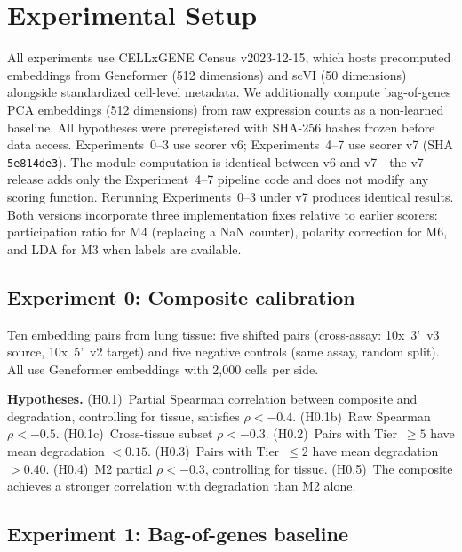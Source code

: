 \documentclass[11pt,letterpaper]{article}
\begin{document}
\section{Experimental Setup}
\label{sec:setup}

All experiments use CELLxGENE Census v2023-12-15, which hosts precomputed embeddings from Geneformer (512 dimensions) and scVI (50 dimensions) alongside standardized cell-level metadata. We additionally compute bag-of-genes PCA embeddings (512 dimensions) from raw expression counts as a non-learned baseline. All hypotheses were preregistered with SHA-256 hashes frozen before data access. Experiments~0--3 use scorer v6; Experiments~4--7 use scorer v7 (SHA \texttt{5e814de3}). The module computation is identical between v6 and v7---the v7 release adds only the Experiment~4--7 pipeline code and does not modify any scoring function. Rerunning Experiments~0--3 under v7 produces identical results. Both versions incorporate three implementation fixes relative to earlier scorers: participation ratio for M4 (replacing a NaN counter), polarity correction for M6, and LDA for M3 when labels are available.

\subsection{Experiment 0: Composite calibration}

Ten embedding pairs from lung tissue: five shifted pairs (cross-assay: 10x~3'~v3 source, 10x~5'~v2 target) and five negative controls (same assay, random split). All use Geneformer embeddings with 2,000 cells per side.

\textbf{Hypotheses.} (H0.1)~Partial Spearman correlation between composite and degradation, controlling for tissue, satisfies $\rho < -0.4$. (H0.1b)~Raw Spearman $\rho < -0.5$. (H0.1c)~Cross-tissue subset $\rho < -0.3$. (H0.2)~Pairs with Tier~$\geq 5$ have mean degradation $< 0.15$. (H0.3)~Pairs with Tier~$\leq 2$ have mean degradation $> 0.40$. (H0.4)~M2 partial $\rho < -0.3$, controlling for tissue. (H0.5)~The composite achieves a stronger correlation with degradation than M2 alone.

\subsection{Experiment 1: Bag-of-genes baseline}
\end{document}

